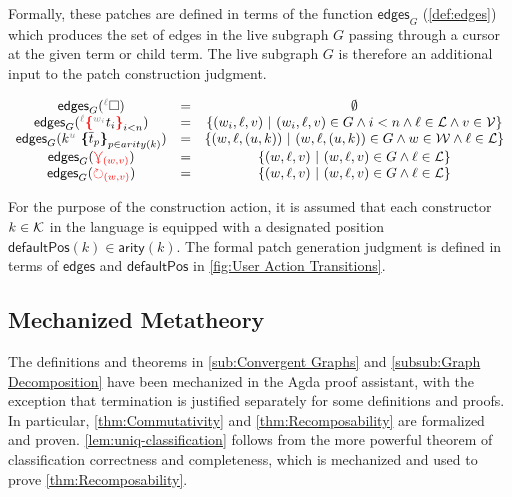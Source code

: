 Formally, these patches are defined in terms of the function $\mathsf{edges}_G$ (\autoref{def:edges}) which produces the set of edges in the live subgraph $G$ passing through a cursor at the given term or child term. The live subgraph $G$ is therefore an additional input to the patch construction judgment.

\begin{definition}
\label{def:edges}
    \[
    \begin{array}{ccc}
    \mathsf{edges}_G(\ehole) & = & \emptyset\\
    \mathsf{edges}_G(\conflict{\termMV}) & = & \SetOf{(w_i,\ell,v)\SuchThat{(w_i,\ell,v)\in G\land i<n\land \ell\in\L\land v\in\V}}\\
    \mathsf{edges}_G(\genericTerm{u}{\subtermMV_p}) & = & \SetOf{(w,\ell,(u,k))\SuchThat{(w,\ell,(u,k))\in G\land w\in\W\land \ell\in\L}}\\
    \mathsf{edges}_G(\multiref) & = & \SetOf{(w,\ell,v)\SuchThat{(w,\ell,v)\in G\land\ell\in\L}}\\
    \mathsf{edges}_G(\uniref) & = & \SetOf{(w,\ell,v)\SuchThat{(w,\ell,v)\in G\land\ell\in\L}}\\
    \end{array}
\]
\end{definition}

For the purpose of the construction action, it is assumed that each constructor $k\in\mathcal{K}$ in the language is equipped with a designated position $\mathsf{defaultPos}(k)\in \mathsf{arity}(k)$. The formal patch generation judgment is defined in terms of $\mathsf{edges}$ and $\mathsf{defaultPos}$ in \autoref{fig:User Action Transitions}.

\figureUserActionTransitions

\subsection{Mechanized Metatheory}

The definitions and theorems in \autoref{sub:Convergent Graphs} and \autoref{subsub:Graph Decomposition} have been mechanized in the Agda proof assistant, with the exception that termination is justified separately for some definitions and proofs. In particular, \autoref{thm:Commutativity} and \autoref{thm:Recomposability} are formalized and proven. \autoref{lem:uniq-classification} follows from the more powerful theorem of classification correctness and completeness, which is mechanized and used to prove \autoref{thm:Recomposability}.


